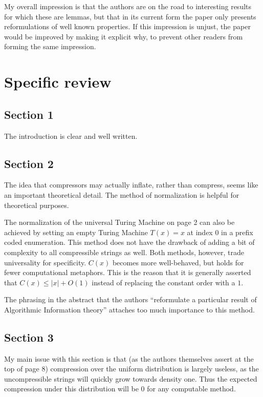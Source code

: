 \documentclass{article}
\theoremstyle{definition}
\begin{document}
My overall impression is that the authors are on the road to interesting results for which these are lemmas, but that in its current form the paper only presents reformulations of well known properties. If this impression is unjust, the paper would be improved by making it explicit why, to prevent other readers from forming the same impression.

\section{Specific review}
\subsection*{Section 1}

The introduction is clear and well written.

\subsection*{Section 2}

The idea that compressors may actually inflate, rather than compress, seems like an important theoretical detail. The method of normalization is helpful for theoretical purposes.

The normalization of the universal Turing Machine on page 2 can also be achieved by setting an empty Turing Machine $T(x) = x$ at index 0 in a prefix coded enumeration. This method does not have the drawback of adding a bit of complexity to all compressible strings as well. Both methods, however, trade universality for specificity. $C(x)$ becomes more well-behaved, but holds for fewer computational metaphors. This is the reason that it is generally asserted that $C(x) \leq |x| + O(1)$ instead of replacing the constant order with a $1$. 

The phrasing in the abstract that the authors ``reformulate a particular result of Algorithmic Information theory'' attaches too much importance to this method.

\pagebreak[4]

\subsection*{Section 3}
My main issue with this section is that (as the authors themselves assert at the top of page 8) compression over the uniform distribution is largely useless, as the uncompressible strings will quickly grow towards density one. Thus the expected compression under this distribution will be 0 for any computable method.
\end{document}
